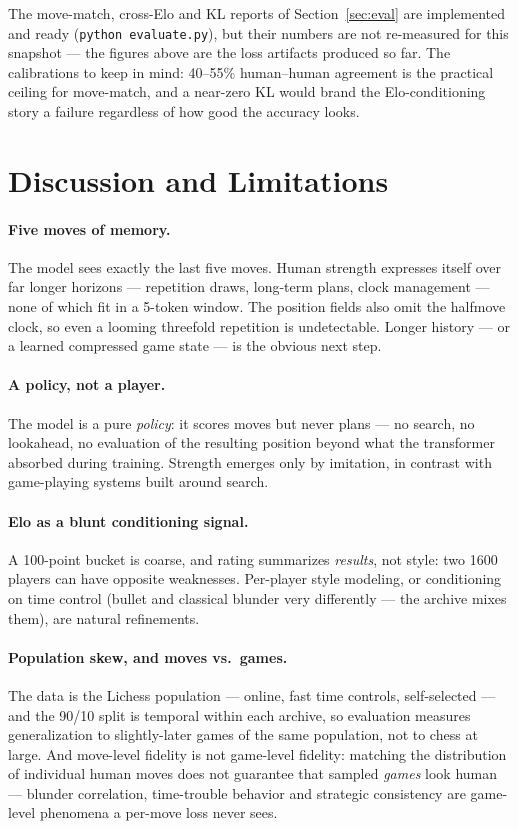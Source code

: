 \documentclass[10pt,a4paper]{article}
\newcommand{\code}[1]{\texttt{#1}}
\begin{document}
The move-match, cross-Elo and KL reports of Section~\ref{sec:eval} are
implemented and ready (\code{python evaluate.py}), but their numbers are
not re-measured for this snapshot --- the figures above are the loss
artifacts produced so far. The calibrations to keep in mind: 40--55\%
human--human agreement is the practical ceiling for move-match, and a
near-zero KL would brand the Elo-conditioning story a failure regardless
of how good the accuracy looks.

\section{Discussion and Limitations}\label{sec:limits}

\paragraph{Five moves of memory.} The model sees exactly the last five
moves. Human strength expresses itself over far longer horizons ---
repetition draws, long-term plans, clock management --- none of which
fit in a 5-token window. The position fields also omit the halfmove
clock, so even a looming threefold repetition is undetectable. Longer
history --- or a learned compressed game state --- is the obvious next
step.

\paragraph{A policy, not a player.} The model is a pure \emph{policy}: it
scores moves but never plans --- no search, no lookahead, no evaluation
of the resulting position beyond what the transformer absorbed during
training. Strength emerges only by imitation, in contrast with
game-playing systems built around search.

\paragraph{Elo as a blunt conditioning signal.} A 100-point bucket is
coarse, and rating summarizes \emph{results}, not style: two 1600
players can have opposite weaknesses. Per-player style modeling, or
conditioning on time control (bullet and classical blunder very
differently --- the archive mixes them), are natural refinements.

\paragraph{Population skew, and moves vs.\ games.} The data is the Lichess
population --- online, fast time controls, self-selected --- and the 90/10
split is temporal within each archive, so evaluation measures
generalization to slightly-later games of the same population, not to
chess at large. And move-level fidelity is not game-level fidelity:
matching the distribution of individual human moves does not guarantee
that sampled \emph{games} look human --- blunder correlation, time-trouble
behavior and strategic consistency are game-level phenomena a per-move
loss never sees.
\end{document}
